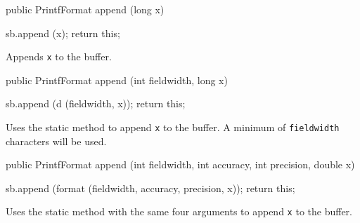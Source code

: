 \begin{htmlonly}
\end{htmlonly}
\begin{code}

   public PrintfFormat append (long x)\begin{hide} {
      sb.append (x);
      return this;
   }\end{hide}
\end{code}
\begin{tabb}   Appends \texttt{x} to the buffer.
\end{tabb}
\begin{htmlonly}
\end{htmlonly}
\begin{code}

   public PrintfFormat append (int fieldwidth, long x)\begin{hide} {
      sb.append (d (fieldwidth, x));
      return this;
   }\end{hide}
\end{code}
\begin{tabb}   Uses the  static method to append \texttt{x} to the buffer.
   A minimum of \texttt{fieldwidth} characters will be used.
\end{tabb}
\begin{htmlonly}
\end{htmlonly}
\begin{code}

   public PrintfFormat append (int fieldwidth, int accuracy, int precision,
                               double x)\begin{hide} {
      sb.append (format (fieldwidth, accuracy, precision, x));
      return this;
   }\end{hide}
\end{code}
\begin{tabb}   Uses the 
   static method with the same four arguments to append \texttt{x} to the buffer.
\end{tabb}
\begin{htmlonly}
\end{htmlonly}
